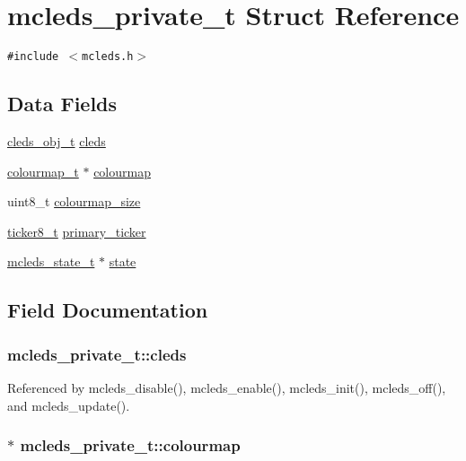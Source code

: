 \hypertarget{structmcleds__private__t}{
\section{mcleds\_\-private\_\-t Struct Reference}
\label{structmcleds__private__t}
}
{\tt \#include $<$mcleds.h$>$}

\subsection*{Data Fields}
\begin{CompactItemize}
\item 
\hyperlink{structcleds__private__t}{cleds\_\-obj\_\-t} \hyperlink{structmcleds__private__t_0fc8afba58685c145ddb3bec70ad75a9}{cleds}
\item 
\hyperlink{colourmap_8h_df5e7dc8c56f0e19912b3f588eceb729}{colourmap\_\-t} $\ast$ \hyperlink{structmcleds__private__t_39149d5ef150bcead0d0138f142d7430}{colourmap}
\item 
uint8\_\-t \hyperlink{structmcleds__private__t_c050bb3fda786a88d006d96e68f63e62}{colourmap\_\-size}
\item 
\hyperlink{structticker8__t}{ticker8\_\-t} \hyperlink{structmcleds__private__t_a28c0e1e2655725ec18a07b5e736a06c}{primary\_\-ticker}
\item 
\hyperlink{structmcleds__state__t}{mcleds\_\-state\_\-t} $\ast$ \hyperlink{structmcleds__private__t_48ecdee91058bddbe8a7b7aef55e7f80}{state}
\end{CompactItemize}


\subsection{Field Documentation}
\hypertarget{structmcleds__private__t_0fc8afba58685c145ddb3bec70ad75a9}{
\subsubsection{ {\bf mcleds\_\-private\_\-t::cleds}}}
\label{structmcleds__private__t_0fc8afba58685c145ddb3bec70ad75a9}




Referenced by mcleds\_\-disable(), mcleds\_\-enable(), mcleds\_\-init(), mcleds\_\-off(), and mcleds\_\-update().\hypertarget{structmcleds__private__t_39149d5ef150bcead0d0138f142d7430}{
\subsubsection{$\ast$ {\bf mcleds\_\-private\_\-t::colourmap}}}
\label{structmcleds__private__t_39149d5ef150bcead0d0138f142d7430}




